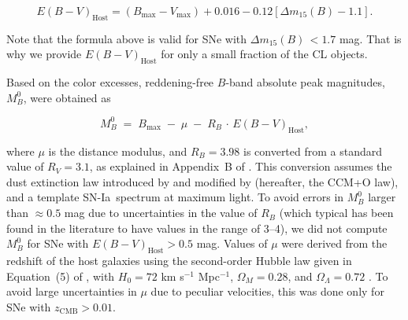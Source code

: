 \documentclass[apj]{emulateapj-rtx4}
\newcommand{\dm}{$\Delta m_{15}(B)$}
\newcommand{\sndia}{SN-Ia}
\newcommand{\omm}{\Omega_M}
\newcommand{\oml}{\Omega_\Lambda}
\begin{document}
{\small
\begin{equation}
\label{eq:ebvh}
E(B-V)_{\mathrm{Host}}=(B_{\mathrm{max}}-V_{\mathrm{max}})+0.016-0.12\left[\Delta m_{15}(B)-1.1\right].
\end{equation}
}

\noindent Note that the formula above is valid for SNe with
\dm\,$<1.7$ mag. That is why we provide $E(B-V)_{\mathrm{Host}}$ for
only a small fraction of the CL objects.

Based on the color excesses, reddening-free $B$-band absolute peak magnitudes,
$M_B^0$, were obtained as 

\begin{equation}
\label{eq:mb0}
M_B^0\;=\;B_{\mathrm{max}}\;-\;\mu\;-\;R_B\,\cdot\,E(B-V)_{\mathrm{Host}},
\end{equation}

\noindent where $\mu$ is the distance modulus, and $R_B=3.98$ is converted
from a standard value of $R_V=3.1$, as explained in Appendix~B of
\citet{folatelli10}. This conversion  
assumes the dust extinction law introduced by 
\citet{cardelli89} and modified by \citet{odonnell94} (hereafter, the
CCM+O law), and a template \sndia\ spectrum at maximum light. To
avoid errors in $M_B^0$ larger than $\approx$$0.5$ mag due to
uncertainties in 
the value of $R_B$ (which typical has been found in the literature
to have values in the range of 3--4),
we did not compute $M_B^0$ for SNe with $E(B-V)_{\mathrm{Host}}>0.5$ mag.
Values of $\mu$ were derived from the redshift of
the host galaxies using the second-order Hubble law given in
Equation~(5) of \citet{folatelli10}, with $H_0=72$ km s$^{-1}$
Mpc$^{-1}$, $\omm=0.28$, and $\oml=0.72$ \citep{spergel07}. To avoid
large uncertainties in $\mu$ due to peculiar velocities, this was done
only for SNe with $z_{\mathrm{CMB}}> 0.01$.
\end{document}
